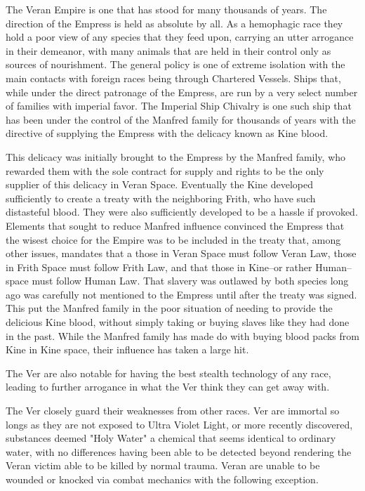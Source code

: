\documentclass[blue]{guildcamp4}
\begin{document}
\name{\bVer{}}

The Veran Empire is one that has stood for many thousands of years. The direction of the Empress is held as absolute by all. As a hemophagic race they hold a poor view of any species that they feed upon, carrying an utter arrogance in their demeanor, with many animals that are held in their control only as sources of nourishment. The general policy is one of extreme isolation with the main contacts with foreign races being through Chartered Vessels. Ships that, while under the direct patronage of the Empress, are run by a very select number of families with imperial favor. The Imperial Ship Chivalry is one such ship that has been under the control of the Manfred family for thousands of years with the directive of supplying the Empress with the delicacy known as Kine blood. 

This delicacy was initially brought to the Empress by the Manfred family, who rewarded them with the sole contract for supply and rights to be the only supplier of this delicacy in Veran Space. Eventually the Kine developed sufficiently to create a treaty with the neighboring Frith, who have such distasteful blood. They were also sufficiently developed to be a hassle if provoked. Elements that sought to reduce Manfred influence convinced the Empress that the wisest choice for the Empire was to be included in the treaty that, among other issues, mandates that a those in Veran Space must follow Veran Law, those in Frith Space must follow Frith Law, and that those in Kine--or rather Human--space must follow Human Law. That slavery was outlawed by both species long ago was carefully not mentioned to the Empress until after the treaty was signed. This put the Manfred family in the poor situation of needing to provide the delicious Kine blood, without simply taking or buying slaves like they had done in the past. While the Manfred family has made do with buying blood packs from Kine in Kine space, their influence has taken a large hit.

The Ver are also notable for having the best stealth technology of any race, leading to further arrogance in what the Ver think they can get away with.

The Ver closely guard their weaknesses from other races. Ver are immortal so longs as they are not exposed to Ultra Violet Light, or more recently discovered, substances deemed "Holy Water" a chemical that seems identical to ordinary water, with no differences having been able to be detected beyond rendering the Veran victim able to be killed by normal trauma. 
Veran are unable to be wounded or knocked via combat mechanics with the following exception.
\end{document}
